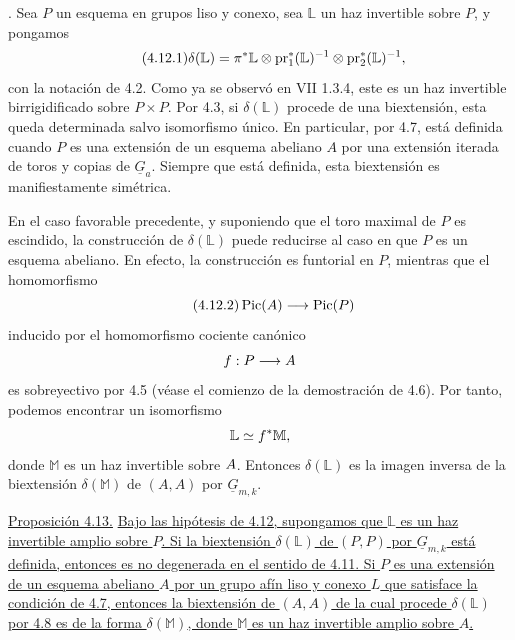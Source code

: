 
\medskip
{}. Sea $P$ un esquema en grupos liso y conexo, sea
$\mathbb L$ un haz invertible sobre $P$, y pongamos
\begin{equation}\tag{4.12.1}
 \delta(\mathbb L)=
 \pi^*\mathbb L\otimes
 \pr_1^*(\mathbb L)^{-1}\otimes
 \pr_2^*(\mathbb L)^{-1},
\end{equation}
con la notación de 4.2. Como ya se observó en VII 1.3.4, este es un haz
invertible birrigidificado sobre $P\times P$. Por 4.3, si
$\delta(\mathbb L)$ procede de una biextensión, esta queda determinada
salvo isomorfismo único. En particular, por 4.7, está definida cuando
$P$ es una extensión de un esquema abeliano $A$ por una extensión
iterada de toros y copias de $\underline G_a$. Siempre que está
definida, esta biextensión es manifiestamente simétrica.


En el caso favorable precedente, y suponiendo que el toro maximal de
$P$ es escindido, la construcción de $\delta(\mathbb L)$ puede
reducirse al caso en que $P$ es un esquema abeliano. En efecto, la
construcción es funtorial en $P$, mientras que el homomorfismo
\begin{equation}\tag{4.12.2}
 \Pic(A)\longrightarrow\Pic(P)
\end{equation}
inducido por el homomorfismo cociente canónico
\[
 f:\sisi{A\longrightarrow P}{P\longrightarrow A}
\]
es sobreyectivo por 4.5 (véase el comienzo de la demostración de 4.6).
Por tanto, podemos encontrar un isomorfismo
\[
 \mathbb L\sisi{^*}{}\simeq f^*\mathbb M,
\]
donde $\mathbb M$ es un haz invertible sobre
$\sisi{\mathbb M}{A}$. Entonces $\delta(\mathbb L)$ es la imagen
inversa de la biextensión $\delta(\mathbb M)$ de $(A,A)$ por
$\underline G_{m,k}$.

\medskip
\noindent\underline{Proposición 4.13.} \underline{Bajo las hipótesis
de 4.12, supongamos que $\mathbb L$ es un haz invertible amplio sobre
$P$. Si la biextensión $\delta(\mathbb L)$ de $(P,P)$ por
$\underline G_{m,k}$ está definida, entonces es no degenerada en el
sentido de 4.11. Si $P$ es una extensión de un esquema abeliano $A$ por
un grupo afín liso y conexo $L$ que satisface la condición de 4.7,
entonces la biextensión de $(A,A)$ de la cual procede
$\delta(\mathbb L)$ por 4.8 es de la forma $\delta(\mathbb M)$, donde
$\mathbb M$ es un haz invertible amplio sobre $A$.}

